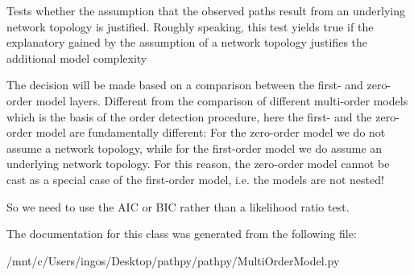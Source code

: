 \begin{DoxyVerb}Tests whether the assumption that the observed paths result
from an underlying network topology is justified. Roughly speaking, 
this test yields true if the explanatory gained by the assumption of 
a network topology justifies the additional model complexity

The decision will be made based on a comparison between the first- 
and zero-order model layers. Different from the comparison of different 
multi-order models which is the basis of the order detection procedure, 
here the first- and the zero-order model are fundamentally different:
For the zero-order model we do not assume a network topology, while for 
the first-order model we do assume an underlying network topology. 
For this reason, the zero-order model cannot be cast as a special case 
of the first-order model, i.e. the models are not nested!

So we need to use the AIC or BIC rather than a likelihood ratio test.
\end{DoxyVerb}
 

The documentation for this class was generated from the following file\-:\begin{DoxyCompactItemize}
\item 
/mnt/c/\-Users/ingos/\-Desktop/pathpy/pathpy/Multi\-Order\-Model.\-py\end{DoxyCompactItemize}
